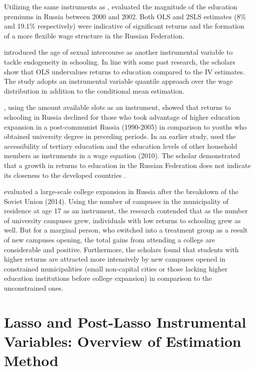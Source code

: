 \documentclass[alpha-refs]{wiley-article-04t}
\begin{document}
Utilizing the same instruments as \citet{cheidvasser_educated_2007}, \citet{akhmedjonov_higher_2011} evaluated the magnitude of the education premiums in Russia between 2000 and 2002. Both OLS and 2SLS estimates (8\% and 19.1\% respectively) were indicative of significant returns and the formation of a more flexible wage structure in the Russian Federation.

\citet{arabsheibani_returns_2012} introduced the age of sexual intercourse as another instrumental variable to tackle endogeneity in schooling. In line with some past research, the scholars show that OLS undervalues returns to education compared to the IV estimates. The study adopts an instrumental variable quantile approach over the wage distribution in addition to the conditional mean estimation.

\citet{kyui_expansion_2016}, using the amount available slots as an instrument, showed that returns to schooling in Russia declined for those who took advantage of higher education expansion in a post-communist Russia (1990-2005) in comparison to youths who obtained university degree in preceding periods. In an earlier study, \citet{kyui_returns_2010} used the accessibility of tertiary education and the education levels of other household members as instruments in a wage equation (2010). The scholar demonstrated that a growth in returns to education in the Russian Federation does not indicate its closeness to the developed countries \citep{kyui_returns_2010}.

\citet{belskaya_college_2014} evaluated a large-scale college expansion in Russia after the breakdown of the Soviet Union (2014). Using the number of campuses in the municipality of residence at age 17 as an instrument, the research contended that as the number of university campuses grew, individuals with low returns to schooling grew as well. But for a marginal person, who switched into a treatment group as a result of new campuses opening, the total gains from attending a college are considerable and positive. Furthermore, the scholars found that students with higher returns are attracted more intensively by new campuses opened in constrained municipalities (small non-capital cities or those lacking higher education institutions before college expansion) in comparison to the unconstrained ones.


\section{Lasso and Post-Lasso Instrumental Variables: Overview of Estimation Method}
\end{document}
